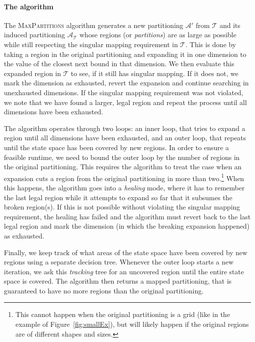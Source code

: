\documentclass{easychair}
\begin{document}
\paragraph{The algorithm} The \textsc{MaxPartitions} algorithm generates a new
partitioning $\mathcal{A}'$ from $\mathcal{T}$ and its induced partitioning
$\mathcal{A}_{\mathcal{T}}$ whose regions (or \textit{partitions}) are as large
as possible while still respecting the singular mapping requirement in
$\mathcal{T}$. This is done by taking a region in the original partitioning and
expanding it in one dimension to the value of the closest next bound in that
dimension. We then evaluate this expanded region in $\mathcal{T}$ to see, if it
still has singular mapping. If it does not, we mark the dimension as exhausted,
revert the expansion and continue searching in unexhausted dimensions. If the
singular mapping requirement was not violated, we note that we have found a
larger, legal region and repeat the process until all dimensions have been
exhausted.

The algorithm operates through two loops: an inner loop, that tries to expand a
region until all dimensions have been exhausted, and an outer loop, that repeats
until the state space has been covered by new regions. In order to ensure a
feasible runtime, we need to bound the outer loop by the number of regions in
the original partitioning. This requires the algorithm to treat the case when an
expansion cuts a region from the original partitioning in more than
two.\footnote{%
    This cannot happen when the original partitioning is a grid (like in the
    example of Figure~\ref{fig:smallEx}), but will likely happen if the original
    regions are of different shapes and sizes.
} When this happens, the algorithm goes into a \textit{healing} mode, where it
has to remember the last legal region while it attempts to expand so far that it
subsumes the broken region(s). If this is not possible without violating the
singular mapping requirement, the healing has failed and the algorithm must
revert back to the last legal region and mark the dimension (in which the
breaking expansion happened) as exhausted.

Finally, we keep track of what areas of the state space have been covered by new
regions using a separate decision tree. Whenever the outer loop starts a new
iteration, we ask this \textit{tracking} tree for an uncovered region until the
entire state space is covered. The algorithm then returns a mapped partitioning,
that is guaranteed to have no more regions than the original partitioning.
\end{document}

